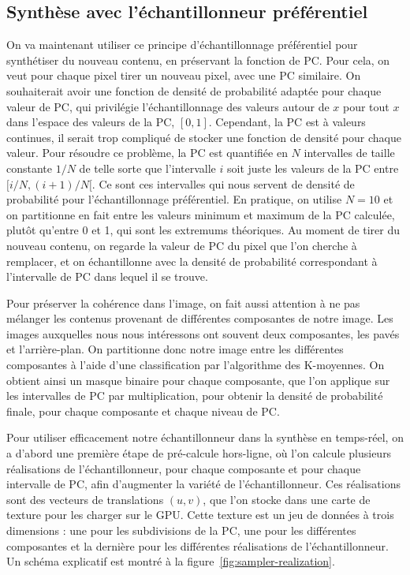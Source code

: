 \subsection{Synthèse avec l'échantillonneur préférentiel}

On va maintenant utiliser ce principe d'échantillonnage préférentiel pour synthétiser du nouveau contenu, en préservant la fonction de PC. Pour cela, on veut pour chaque pixel tirer un nouveau pixel, avec une PC similaire. On souhaiterait avoir une fonction de densité de probabilité adaptée pour chaque valeur de PC, qui privilégie l'échantillonnage des valeurs autour de $x$ pour tout $x$ dans l'espace des valeurs de la PC, $[0, 1]$. Cependant, la PC est à valeurs continues, il serait trop compliqué de stocker une fonction de densité pour chaque valeur. Pour résoudre ce problème, la PC est quantifiée en $N$ intervalles de taille constante $1/N$ de telle sorte que l'intervalle $i$ soit juste les valeurs de la PC entre $[i/N, (i+1)/N[$. Ce sont ces intervalles qui nous servent de densité de probabilité pour l'échantillonnage préférentiel. En pratique, on utilise $N=10$ et on partitionne en fait entre les valeurs minimum et maximum de la PC calculée, plutôt qu'entre 0 et 1, qui sont les extremums théoriques. Au moment de tirer du nouveau contenu, on regarde la valeur de PC du pixel que l'on cherche à remplacer, et on échantillonne avec la densité de probabilité correspondant à l'intervalle de PC dans lequel il se trouve.

\bigskip

Pour préserver la cohérence dans l'image, on fait aussi attention à ne pas mélanger les contenus provenant de différentes \og composantes \fg de notre image. Les images auxquelles nous nous intéressons ont souvent deux composantes, les pavés et l'arrière-plan. On partitionne donc notre image entre les différentes composantes à l'aide d'une classification par l'algorithme des K-moyennes. On obtient ainsi un masque binaire pour chaque composante, que l'on applique sur les intervalles de PC par multiplication, pour obtenir la densité de probabilité finale, pour chaque composante et chaque niveau de PC.

\bigskip

Pour utiliser efficacement notre échantillonneur dans la synthèse en temps-réel, on a d'abord une première étape de pré-calcule hors-ligne, où l'on calcule plusieurs réalisations de l'échantillonneur, pour chaque composante et pour chaque intervalle de PC, afin d'augmenter la variété de l'échantillonneur. Ces réalisations sont des vecteurs de translations $(u, v)$, que l'on stocke dans une carte de texture pour les charger sur le GPU. Cette texture est un jeu de données à trois dimensions : une pour les subdivisions de la PC, une pour les différentes composantes et la dernière pour les différentes réalisations de l'échantillonneur. Un schéma explicatif est montré à la figure~\ref{fig:sampler-realization}.

